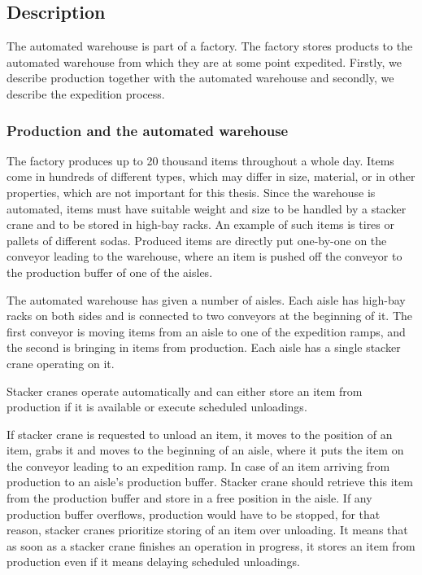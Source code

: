 \documentclass{ctuthesis}
\begin{document}
\subsection{Description}
\label{subsec:Description}
The automated warehouse is part of a factory. The factory stores products to the automated warehouse from which they are at some point expedited. Firstly, we describe production together with the automated warehouse and secondly, we describe the expedition process.

\subsubsection{Production and the automated warehouse}

The factory produces up to 20 thousand items throughout a whole day. Items come in hundreds of different types, which may differ in size, material, or in other properties, which are not important for this thesis. Since the warehouse is automated, items must have suitable weight and size to be handled by a stacker crane and to be stored in high-bay racks. An example of such items is tires or pallets of different sodas. Produced items are directly put one-by-one on the conveyor leading to the warehouse, where an item is pushed off the conveyor to the production buffer of one of the aisles.

The automated warehouse has given a number of aisles. Each aisle has high-bay racks on both sides and is connected to two conveyors at the beginning of it. The first conveyor is moving items from an aisle to one of the expedition ramps, and the second is bringing in items from production. Each aisle has a single stacker crane operating on it.

Stacker cranes operate automatically and can either store an item from production if it is available or execute scheduled unloadings. 

If stacker crane is requested to unload an item, it moves to the position of an item, grabs it and moves to the beginning of an aisle, where it puts the item on the conveyor leading to an expedition ramp. In case of an item arriving from production to an aisle's production buffer. Stacker crane should retrieve this item from the production buffer and store in a free position in the aisle. If any production buffer overflows, production would have to be stopped, for that reason, stacker cranes prioritize storing of an item over unloading. It means that as soon as a stacker crane finishes an operation in progress, it stores an item from production even if it means delaying scheduled unloadings.
\end{document}
